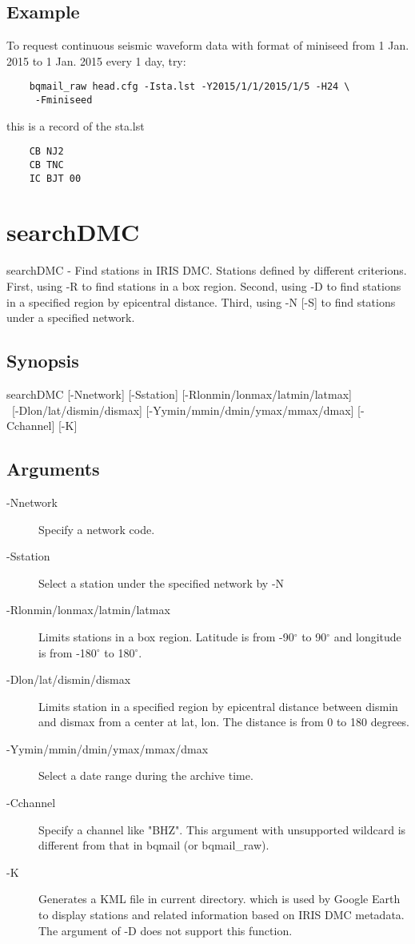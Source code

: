 \documentclass[12pt, a4paper]{report}
\begin{document}
\subsection{Example}
To request continuous seismic waveform data with format of miniseed from 1 Jan. 2015 to 1 Jan. 2015 every 1 day, try:
\begin{lstlisting}
	bqmail_raw head.cfg -Ista.lst -Y2015/1/1/2015/1/5 -H24 \ 
	 -Fminiseed
\end{lstlisting}
this is a record of the {\ti sta.lst}
\begin{lstlisting}
	CB NJ2
	CB TNC
	IC BJT 00
\end{lstlisting}

\section{searchDMC}
searchDMC - Find stations in IRIS DMC. Stations defined by different criterions. First, using {\tb -R} to find stations in a box region. Second, using {\tb -D} to find stations in a specified region by epicentral distance. Third, using {\tb -N [-S]} to find stations under a specified network.
\subsection{Synopsis}
{\tb searchDMC} [{\tb -N}{\ti network}] [{\tb -S}{\ti station}] [{\tb -R}{\ti lonmin/lonmax/latmin/latmax}] \\\
[{\tb -D}{\ti lon/lat/dismin/dismax}] [{\tb -Y}{\ti ymin/mmin/dmin/ymax/mmax/dmax}] [{\tb -C}{\ti channel}] [{\tb -K}]
\subsection{Arguments}
\begin{description}
\item[{\tb -N}{\ti network}] Specify a network code.
\item[{\tb -S}{\ti station}] Select a station under the specified network by {\tb -N}
\item[{\tb -R}{\ti lonmin/lonmax/latmin/latmax}] Limits stations in a box region. Latitude is from -90$^\circ$ to 90$^\circ$  and longitude is from -180$^\circ$ to 180$^\circ$.
\item[{\tb -D}{\ti lon/lat/dismin/dismax}] Limits station in a specified region by epicentral distance between {\ti dismin} and {\ti dismax} from a center at {\ti lat, lon}. The distance is from 0 to 180 degrees.
\item[{\tb -Y}{\ti ymin/mmin/dmin/ymax/mmax/dmax}] Select a date range during the archive time.
\item[{\tb -C}{\ti channel}] Specify a channel like "{\ti BHZ}". This argument with unsupported wildcard is different from that in {\tb bqmail} (or {\tb bqmail\_raw}).
\item[{\tb -K}] Generates a KML file in current directory. which is used by Google Earth to display stations and related information based on IRIS DMC metadata. The argument of {\tb -D} does not support this function.
\end{description}
\end{document}

